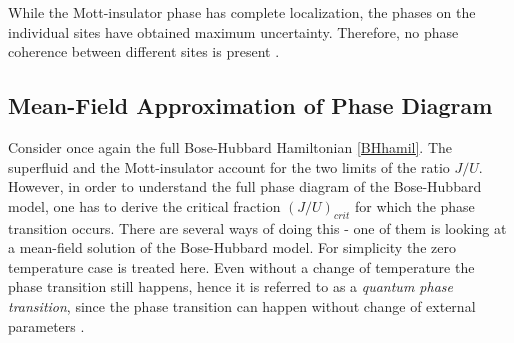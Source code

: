 While the Mott-insulator phase has complete localization, the phases on the individual sites have obtained maximum uncertainty. Therefore, no phase coherence between different sites is present \cite{greiner}.


\subsection{Mean-Field Approximation of Phase Diagram} \label{sec:MeanFieldDiagram}
Consider once again the full Bose-Hubbard Hamiltonian \eqref{BHhamil}. The superfluid and the Mott-insulator account for the two limits of the ratio $J/U$. However, in order to understand the full phase diagram of the Bose-Hubbard model, one has to derive the critical fraction $(J/U)_{crit}$ for which the phase transition occurs. There are several ways of doing this - one of them is looking at a mean-field solution of the Bose-Hubbard model. For simplicity the zero temperature case is treated here. Even without a change of temperature the phase transition still happens, hence it is referred to as a \textit{quantum phase transition}, since the phase transition can happen without change of external parameters \cite{Sachdev2007QPT}.


